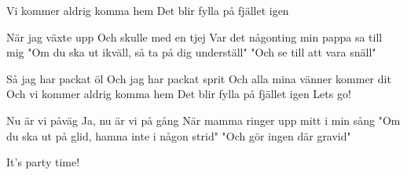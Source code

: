 \medskip

\begin{guitar}
  Vi kommer aldrig komma hem
  Det blir fylla på fjället igen

  När jag växte upp
  Och skulle med en tjej
  Var det någonting min pappa sa till mig
  "Om du ska ut ikväll, så ta på dig underställ"
  "Och se till att vara snäll"

  \smallskip

  Så jag har packat öl
  Och jag har packat sprit
  Och alla mina vänner kommer dit
  Och vi kommer aldrig komma hem
  Det blir fylla på fjället igen
  Lets go!

  \smallskip

  Nu är vi påväg
  Ja, nu är vi på gång
  När mamma ringer upp mitt i min sång
  "Om du ska ut på glid, hamna inte i någon strid"
  "Och gör ingen där gravid"


  It's party time!
\end{guitar}
